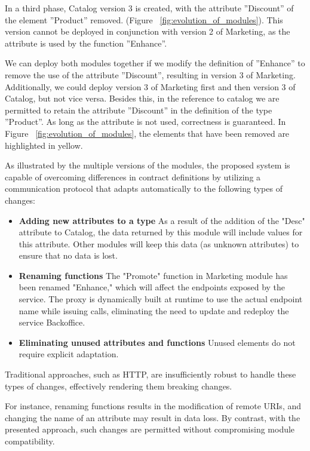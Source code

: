 In a third phase, Catalog version 3 is created, with the attribute ''Discount'' of the element ''Product'' removed.  (Figure ~\ref{fig:evolution_of_modules}).
This version cannot be deployed in conjunction with version 2 of Marketing, as the attribute is used by the function ''Enhance''.

We can deploy both modules together if we modify the definition of ''Enhance'' to remove the use of the attribute ''Discount'', resulting in version 3 of Marketing.
Additionally, we could deploy version 3 of Marketing first and then version 3 of Catalog, but not vice versa.
Besides this, in the reference to catalog we are permitted to retain the attribute ''Discount'' in the definition of the type ''Product''.
As long as the attribute is not used, correctness is guaranteed.
In Figure ~\ref{fig:evolution_of_modules}, the elements that have been removed are highlighted in yellow.

As illustrated by the multiple versions of the modules,
the proposed system is capable of overcoming differences in contract definitions by utilizing a communication protocol
that adapts automatically to the following types of changes:

\begin{itemize}
    \item \textbf{Adding new attributes to a type} As a result of the addition of the "Desc" attribute to Catalog, the data returned by this module will include values for this attribute.
    Other modules will keep this data (as unknown attributes) to ensure that no data is lost.
    \item \textbf{Renaming functions} The "Promote" function in Marketing module has been renamed "Enhance," which will affect the endpoints exposed by the service.
    The proxy is dynamically built at runtime to use the actual endpoint name while issuing calls, eliminating the need to update and redeploy the service Backoffice.
    \item \textbf{Eliminating unused attributes and functions} Unused elements do not require explicit adaptation.
\end{itemize}

Traditional approaches, such as HTTP, are insufficiently robust to handle these types of changes, effectively rendering them breaking changes.

For instance, renaming functions results in the modification of remote URIs, and changing the name of an attribute may result in data loss.
By contrast, with the presented approach, such changes are permitted without compromising module compatibility.

